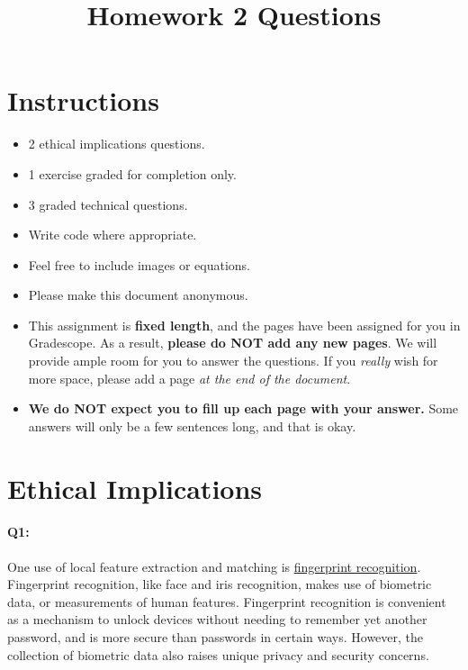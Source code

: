 \date{}

\title{\vspace{-1cm}Homework 2 Questions}



\maketitle
\vspace{-3cm}
\thispagestyle{fancy}

\section*{Instructions}
\begin{itemize}
  \item 2 ethical implications questions.
  \item 1 exercise graded for completion only.
  \item 3 graded technical questions.
  \item Write code where appropriate.
  \item Feel free to include images or equations.
  \item Please make this document anonymous.
  \item This assignment is \textbf{fixed length}, and the pages have been assigned for you in Gradescope. As a result, \textbf{please do NOT add any new pages}. We will provide ample room for you to answer the questions. If you \emph{really} wish for more space, please add a page \emph{at the end of the document}.
  \item \textbf{We do NOT expect you to fill up each page with your answer.} Some answers will only be a few sentences long, and that is okay.
\end{itemize}
\pagebreak
\section*{Ethical Implications}

\paragraph{Q1:} One use of local feature extraction and matching is \href{https://www.youtube.com/watch?v=xD88Qs_DZp4}{fingerprint recognition}. Fingerprint recognition, like face and iris recognition, makes use of biometric data, or measurements of human features. Fingerprint recognition is convenient as a mechanism to unlock devices without needing to remember yet another password, and is more secure than passwords in certain ways. However, the collection of biometric data also raises unique privacy and security concerns.

